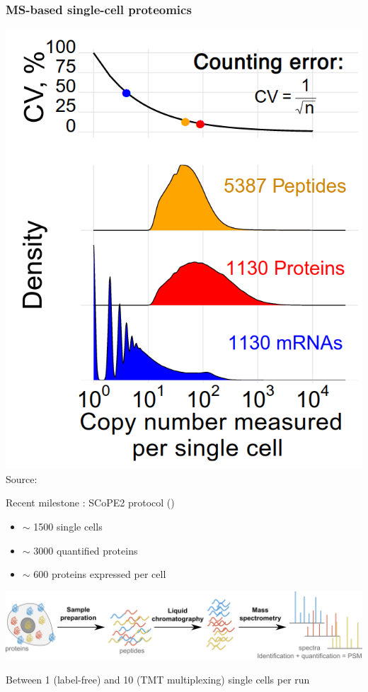 \documentclass{beamer}
\begin{document}
\begin{frame}[allowframebreaks, b]
  \frametitle{MS-based single-cell proteomics}
  
  \begin{center}
    \includegraphics[width=0.5\linewidth]{figs/Counting_error.png}\\
    Source: \cite{Specht2020-jm}
  \end{center}
  
  \framebreak
  
  Recent milestone : SCoPE2 protocol {\footnotesize(\cite{Specht2020-jm})}
  \begin{itemize}
    \item $\sim$ 1500 single cells 
    \item $\sim$ 3000 quantified proteins
    \item $\sim$ 600 proteins expressed per cell
  \end{itemize}

  \vfill
  \includegraphics[width=\linewidth]{figs/MS-SCP.png}
  
  \vfill
  Between 1 (label-free) and 10 (TMT multiplexing) single cells per run
  \vfill
  
\end{frame}
\end{document}
